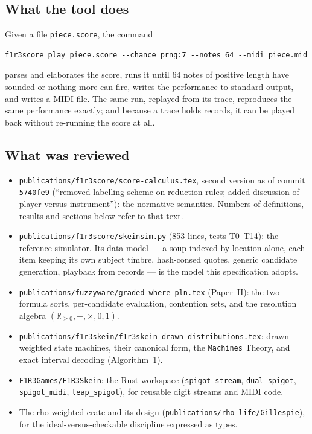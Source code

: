 \documentclass[11pt,a4paper]{article}
\theoremstyle{definition}
\theoremstyle{remark}
\newcommand{\Rnn}{\mathbb{R}_{\geq 0}}
\begin{document}
\subsection{What the tool does}

Given a file \texttt{piece.score}, the command
\begin{lstlisting}
f1r3score play piece.score --chance prng:7 --notes 64 --midi piece.mid
\end{lstlisting}
parses and elaborates the score, runs it until 64 notes of positive length have
sounded or nothing more can fire, writes the performance to standard output,
and writes a MIDI file. The same run, replayed from its trace, reproduces the
same performance exactly; and because a trace holds records, it can be played
back without re-running the score at all.

\subsection{What was reviewed}

\begin{itemize}[leftmargin=*,itemsep=2pt]
\item \texttt{publications/f1r3score/score-calculus.tex}, second version as of
  commit \texttt{5740fe9} (``removed labelling scheme on reduction rules; added
  discussion of player versus instrument''): the normative semantics. Numbers
  of definitions, results and sections below refer to that text.
\item \texttt{publications/f1r3score/skeinsim.py} (853 lines, tests T0--T14):
  the reference simulator. Its data model --- a soup indexed by location alone,
  each item keeping its own subject timbre, hash-consed quotes, generic
  candidate generation, playback from records --- is the model this
  specification adopts.
\item \texttt{publications/fuzzyware/graded-where-pln.tex} (Paper~II): the two
  formula sorts, per-candidate evaluation, contention sets, and the resolution
  algebra $(\Rnn,+,\times,0,1)$.
\item \texttt{publications/f1r3skein/f1r3skein-drawn-distributions.tex}: drawn
  weighted state machines, their canonical form, the \texttt{Machines} Theory,
  and exact interval decoding (Algorithm~1).
\item \texttt{F1R3Games/F1R3Skein}: the Rust workspace (\texttt{spigot\_stream},
  \texttt{dual\_spigot}, \texttt{spigot\_midi}, \texttt{leap\_spigot}), for
  reusable digit streams and MIDI code.
\item The rho-weighted crate and its design (\texttt{publications/rho-life/Gillespie}),
  for the ideal-versus-checkable discipline expressed as types.
\end{itemize}
\end{document}
